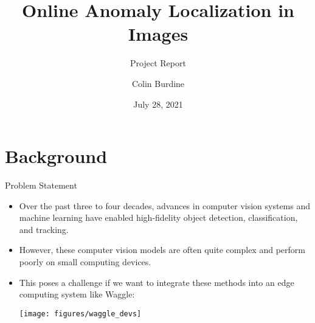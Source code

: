 \documentclass[10pt]{beamer}
\title{Online Anomaly Localization in Images}
\subtitle{Project Report}
\date{July 28, 2021}
\author{Colin Burdine}
\institute{SULI Intern $|$ Argonne National Laboratory}
\begin{document}
\maketitle


\section{Background}


\begin{frame}{Problem Statement}

\begin{itemize}
\item Over the past three to four decades, advances in computer vision systems and machine learning have enabled high-fidelity object detection, classification, and tracking.

\item However, these computer vision models are often quite complex and perform poorly on small computing devices.

\pause 
\item This poses a challenge if we want to integrate these methods into an \alert{edge computing} system like Waggle:\\[4mm]
\begin{center}
\texttt{[image: figures/waggle\_devs]}
\end{center}

\end{itemize}
\end{frame}
\end{document}
